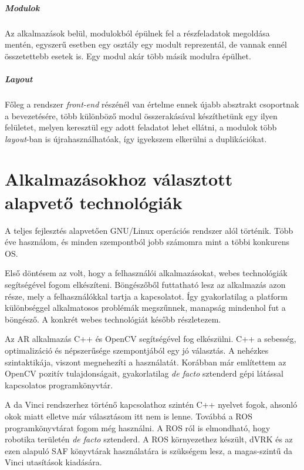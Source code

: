 \documentclass[12pt,a4paper,oneside]{report} %
\begin{document}
\subparagraph{Modulok}
Az alkalmazások belül, modulokból épülnek fel a részfeladatok megoldása mentén, egyszerű esetben egy osztály egy modult reprezentál, de vannak ennél összetettebb esetek is. Egy modul akár több másik modulra épülhet.

\subparagraph{Layout}
Főleg a rendszer \textit{front-end} részénél van értelme ennek újabb absztrakt csoportnak a bevezetésére, több különböző modul összerakásával készíthetünk egy ilyen felületet, melyen keresztül egy adott feladatot lehet ellátni, a modulok több \textit{layout}-ban is újrahasználhatóak, így igyekszem elkerülni a duplikációkat.


\section{Alkalmazásokhoz választott alapvető technológiák}
A teljes fejlesztés alapvetően GNU/Linux operációs rendszer alól történik. Több éve használom, és minden szempontból jobb számomra mint a többi konkurens OS.
\par Első döntésem az volt, hogy a felhasználói alkalmazásokat, webes technológiák segítségével fogom elkészíteni. Böngészőből futtatható lesz  az alkalmazás azon része, mely a felhasználókkal tartja a kapcsolatot. Így gyakorlatilag a platform különbséggel alkalmatosos problémák megszűnnek, manapság mindenhol fut a böngésző. A konkrét webes technológiát később részletezem. 
\par Az AR alkalmazás C++ és OpenCV segítségével fog elkészülni. C++ a sebesség, optimalizáció és népszerűsége szempontjából egy jó választás. A nehézkes szintaktikája, viszont megnehezíti a használatát. Korábban már említettem az OpenCV pozitív tulajdonságait, gyakorlatilag \textit{de facto} sztenderd gépi látással kapcsolatos programkönyvtár. 
\par A da Vinci rendszerhez történő kapcsolathoz szintén C++ nyelvet fogok, ahsonló okok miatt elletve már választásom itt nem is lenne. Továbbá a ROS  programkönyvtárat fogom még használni.  A ROS ról is elmondható, hogy robotika területén \textit{de facto} sztenderd. A ROS környezethez készült, dVRK és az ezen alapuló SAF könyvtárak használatára is szükségem lesz, a magas-szintű da Vinci utasítások kiadására. 
\end{document}
